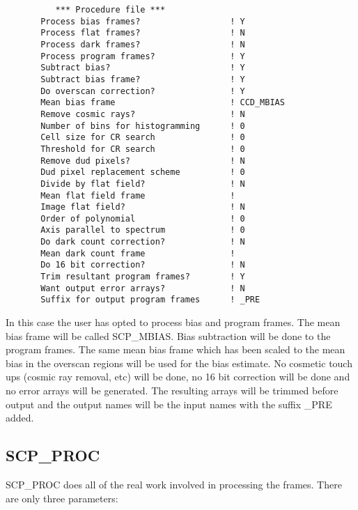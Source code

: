 \begin{verbatim}
          *** Procedure file ***                         
       Process bias frames?                  ! Y         
       Process flat frames?                  ! N         
       Process dark frames?                  ! N         
       Process program frames?               ! Y         
       Subtract bias?                        ! Y         
       Subtract bias frame?                  ! Y         
       Do overscan correction?               ! Y         
       Mean bias frame                       ! CCD_MBIAS 
       Remove cosmic rays?                   ! N         
       Number of bins for histogramming      ! 0         
       Cell size for CR search               ! 0         
       Threshold for CR search               ! 0         
       Remove dud pixels?                    ! N         
       Dud pixel replacement scheme          ! 0         
       Divide by flat field?                 ! N         
       Mean flat field frame                 !           
       Image flat field?                     ! N         
       Order of polynomial                   ! 0         
       Axis parallel to spectrum             ! 0         
       Do dark count correction?             ! N         
       Mean dark count frame                 !           
       Do 16 bit correction?                 ! N         
       Trim resultant program frames?        ! Y         
       Want output error arrays?             ! N         
       Suffix for output program frames      ! _PRE      
\end{verbatim}

In this case the user has opted to process bias and program frames. The mean
bias frame will be called SCP\_MBIAS. Bias subtraction will be done to the
program frames.  The same mean bias frame which has been scaled to the mean
bias in the overscan regions will be used for the bias estimate.  No cosmetic
touch ups (cosmic ray removal, etc) will be done, no 16 bit correction will be
done and no error arrays will be generated.  The resulting arrays will be
trimmed before output and the output names will be the input names with the
suffix \_PRE added.

\subsection {SCP\_PROC} \label{sec:imfil}

SCP\_PROC does all of the real work involved in processing the frames.
There are only three parameters:

